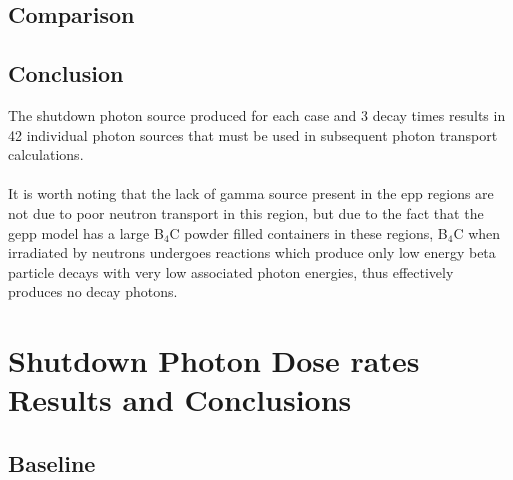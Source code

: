 \documentclass[12pt]{article}
\begin{document}
\subsection{Comparison}
\subsection{Conclusion}
The shutdown photon source produced for each case and 3 decay times results in
42 individual photon sources that must be used in subsequent photon transport
calculations.
\\
\\
It is worth noting that the lack of gamma source present in the \gls{epp}
regions are not due to poor neutron transport in this region, but due to the
fact that the \gls{gepp} model has a large B$_4$C powder filled containers
in these regions, B$_4$C when irradiated by neutrons undergoes reactions
which produce only low energy beta particle decays with very low associated
photon energies, thus effectively produces no decay photons.
\newpage
\clearpage
\section{Shutdown Photon Dose rates Results and Conclusions}
\subsection{Baseline}
\end{document}
